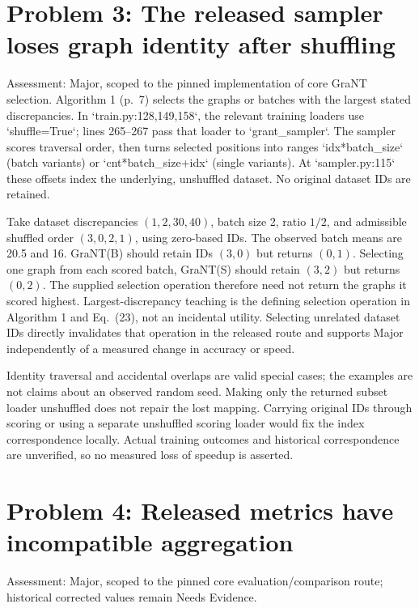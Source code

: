 \documentclass[10pt]{article}
\begin{document}
\section*{Problem 3: The released sampler loses graph identity after shuffling}
Assessment: Major, scoped to the pinned implementation of core GraNT selection. Algorithm 1 (p. 7) selects the graphs or batches with the largest stated discrepancies. In `train.py:128,149,158`, the relevant training loaders use `shuffle=True`; lines 265–267 pass that loader to `grant\_sampler`. The sampler scores traversal order, then turns selected positions into ranges `idx*batch\_size` (batch variants) or `cnt*batch\_size+idx` (single variants). At `sampler.py:115` these offsets index the underlying, unshuffled dataset. No original dataset IDs are retained.\par
Take dataset discrepancies \((1,2,30,40)\), batch size 2, ratio \(1/2\), and admissible shuffled order \((3,0,2,1)\), using zero-based IDs. The observed batch means are 20.5 and 16. GraNT(B) should retain IDs \((3,0)\) but returns \((0,1)\). Selecting one graph from each scored batch, GraNT(S) should retain \((3,2)\) but returns \((0,2)\). The supplied selection operation therefore need not return the graphs it scored highest. Largest-discrepancy teaching is the defining selection operation in Algorithm 1 and Eq. (23), not an incidental utility. Selecting unrelated dataset IDs directly invalidates that operation in the released route and supports Major independently of a measured change in accuracy or speed.\par
Identity traversal and accidental overlaps are valid special cases; the examples are not claims about an observed random seed. Making only the returned subset loader unshuffled does not repair the lost mapping. Carrying original IDs through scoring or using a separate unshuffled scoring loader would fix the index correspondence locally. Actual training outcomes and historical correspondence are unverified, so no measured loss of speedup is asserted.\par
\section*{Problem 4: Released metrics have incompatible aggregation}
Assessment: Major, scoped to the pinned core evaluation/comparison route; historical corrected values remain Needs Evidence.\par
\end{document}
